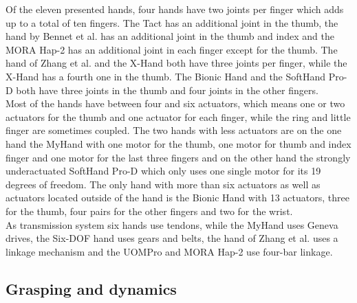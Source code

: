 \documentclass[a4paper, 10pt, conference]{ieeeconf}      %
\begin{document}
Of the eleven presented hands, four hands have two joints per finger which adds up to a total of ten fingers. The Tact has an additional joint in the thumb, the hand by Bennet et al. has an additional joint in the thumb and index and the MORA Hap-2 has an additional joint in each finger except for the thumb. The hand of Zhang et al. and the X-Hand both have three joints per finger, while the X-Hand has a fourth one in the thumb. The Bionic Hand and the SoftHand Pro-D both have three joints in the thumb and four joints in the other fingers.\\
Most of the hands have between four and six actuators, which means one or two actuators for the thumb and one actuator for each finger, while the ring and little finger are sometimes coupled. The two hands with less actuators are on the one hand the MyHand with one motor for the thumb, one motor for thumb and index finger and one motor for the last three fingers and on the other hand the strongly underactuated SoftHand Pro-D which only uses one single motor for its 19 degrees of freedom. The only hand with more than six actuators as well as actuators located outside of the hand is the Bionic Hand with 13 actuators, three for the thumb, four pairs for the other fingers and two for the wrist.\\
As transmission system six hands use tendons, while the MyHand uses Geneva drives, the Six-DOF hand uses gears and belts, the hand of Zhang et al. uses a linkage mechanism and the UOMPro and MORA Hap-2 use four-bar linkage.

\subsection{Grasping and dynamics}
\end{document}

